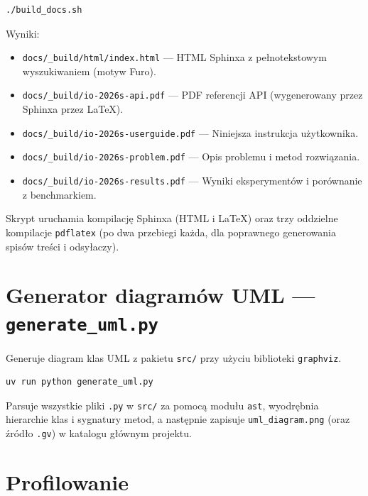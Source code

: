 \documentclass[11pt,a4paper]{article}
\begin{document}
\begin{lstlisting}[language=bash]
./build_docs.sh
\end{lstlisting}

Wyniki:
\begin{itemize}[noitemsep]
  \item \texttt{docs/\_build/html/index.html} --- HTML Sphinxa z pełnotekstowym
        wyszukiwaniem (motyw Furo).
  \item \texttt{docs/\_build/io-2026s-api.pdf} --- PDF referencji API
        (wygenerowany przez Sphinxa przez LaTeX).
  \item \texttt{docs/\_build/io-2026s-userguide.pdf} --- Niniejsza instrukcja
        użytkownika.
  \item \texttt{docs/\_build/io-2026s-problem.pdf} --- Opis problemu i metod
        rozwiązania.
  \item \texttt{docs/\_build/io-2026s-results.pdf} --- Wyniki eksperymentów
        i porównanie z benchmarkiem.
\end{itemize}

Skrypt uruchamia kompilację Sphinxa (HTML i LaTeX) oraz trzy oddzielne
kompilacje \texttt{pdflatex} (po dwa przebiegi każda, dla poprawnego
generowania spisów treści i odsyłaczy).

\section{Generator diagramów UML --- \texttt{generate\_uml.py}}

Generuje diagram klas UML z pakietu \texttt{src/} przy użyciu biblioteki
\texttt{graphviz}.

\begin{lstlisting}[language=bash]
uv run python generate_uml.py
\end{lstlisting}

Parsuje wszystkie pliki \texttt{.py} w \texttt{src/} za pomocą modułu
\texttt{ast}, wyodrębnia hierarchie klas i sygnatury metod, a następnie
zapisuje \texttt{uml\_diagram.png} (oraz źródło \texttt{.gv}) w katalogu
głównym projektu.

\section{Profilowanie}
\end{document}
